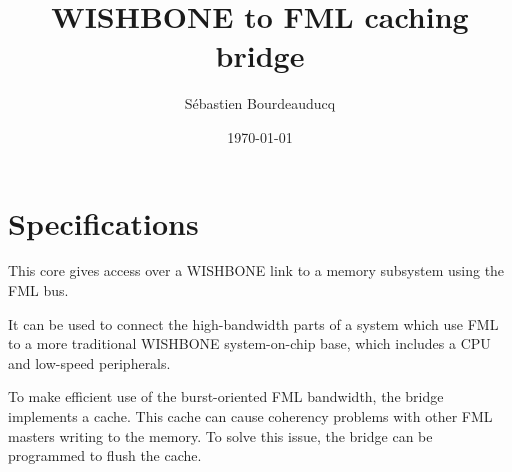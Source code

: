 \documentclass[a4paper,11pt]{article}
\title{WISHBONE to FML caching bridge}
\author{S\'ebastien Bourdeauducq}
\date{\today}
\begin{document}
\maketitle{}
\section{Specifications}
This core gives access over a WISHBONE link to a memory subsystem using the FML bus.

It can be used to connect the high-bandwidth parts of a system which use FML to a more traditional WISHBONE system-on-chip base, which includes a CPU and low-speed peripherals.

To make efficient use of the burst-oriented FML bandwidth, the bridge implements a cache. This cache can cause coherency problems with other FML masters writing to the memory. To solve this issue, the bridge can be programmed to flush the cache.
\end{document}
